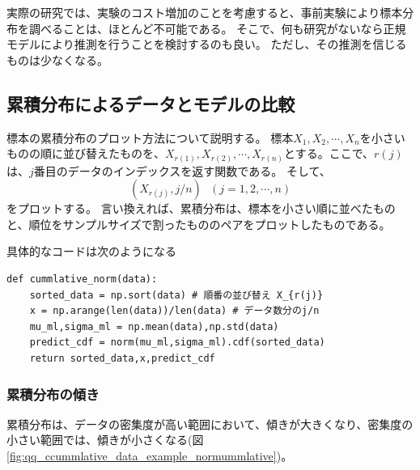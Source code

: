 実際の研究では、実験のコスト増加のことを考慮すると、事前実験により標本分布を調べることは、ほとんど不可能である。
そこで、何も研究がないなら正規モデルにより推測を行うことを検討するのも良い。
ただし、その推測を信じるものは少なくなる。




\subsection{累積分布によるデータとモデルの比較}

標本の累積分布のプロット方法について説明する。
標本$X_1,X_2,\cdots,X_n$を小さいものの順に並び替えたものを、$X_{r(1)},X_{r(2)},\cdots,X_{r(n)}$とする。ここで、$r(j)$は、$j$番目のデータのインデックスを返す関数である。
そして、
\begin{equation*}
    (X_{r(j)},j/n) \ \ \ (j=1,2,\cdots,n)
\end{equation*}
をプロットする。
言い換えれば、累積分布は、標本を小さい順に並べたものと、順位をサンプルサイズで割ったもののペアをプロットしたものである。

具体的なコードは次のようになる
\begin{lstlisting}
def cummlative_norm(data):
    sorted_data = np.sort(data) # 順番の並び替え X_{r(j)}
    x = np.arange(len(data))/len(data) # データ数分のj/n 
    mu_ml,sigma_ml = np.mean(data),np.std(data)
    predict_cdf = norm(mu_ml,sigma_ml).cdf(sorted_data)
    return sorted_data,x,predict_cdf
\end{lstlisting}

\subsubsection{累積分布の傾き}
累積分布は、データの密集度が高い範囲において、傾きが大きくなり、密集度の小さい範囲では、傾きが小さくなる(図\ref{fig:qq_ccummlative_data_example_normummlative})。


